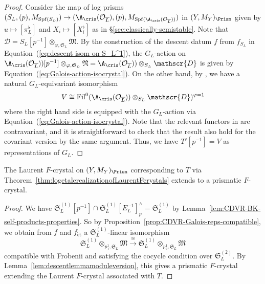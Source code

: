 \begin{proof}
Consider the map of log prisms $(S_L, (p), M_{\operatorname{Spf}(S_L)}) \rightarrow (\A_{\cris}(\mathcal{O}_{\overline{L}}), (p), M_{\operatorname{Spf}(\A_{\cris}(\mathcal{O}_{\overline{L}}))})$ in $(Y, M_Y)_{\Prism}$ given by $u \mapsto [\pi_L^{\flat}]$ and $X_i \mapsto [X_i^{\flat}]$ as in \S\ref{sec:classically-semistable}. Note that $\mathscr{D} = S_L[p^{-1}]\otimes_{\varphi, \mathfrak{S}_L} \mathfrak{M}$. By the construction of the descent datum $f$ from $f_{S_L}$ in Equation~(\ref{eq:descent isom on S_L^1}), the $G_L$-action on $\A_{\cris}(\mathcal{O}_{\overline{L}}))[p^{-1}]\otimes_{\varphi, \mathfrak{S}_L} \mathfrak{N} = \A_{\cris}(\mathcal{O}_{\overline{L}}))\otimes_{S_L} \mathscr{D}$ is given by Equation~(\ref{eq:Galois-action-isocrystal}). On the other hand, by \cite[\S4.1]{moon-strly-div-latt-cryst-cohom-CDVF}, we have a natural $G_L$-equivariant isomorphism
\[
V \cong \mathrm{Fil}^0(\A_{\cris}(\mathcal{O}_{\overline{L}}))\otimes_{S_L} \mathscr{D})^{\varphi = 1}
\]
where the right hand side is equipped with the $G_L$-action via Equation~(\ref{eq:Galois-action-isocrystal}). Note that the relevant functors in \cite{moon-strly-div-latt-cryst-cohom-CDVF} are contravariant, and it is straightforward to check that the result also hold for the covariant version by the same argument. Thus, we have $T'[p^{-1}] = V$ as representations of $G_L$.
\end{proof}

\begin{prop} \label{prop:classically-semistable-implies-semistable}
The Laurent $F$-crystal on $(Y, M_Y)_{\Prism}$ corresponding to $T$ via Theorem~\ref{thm:logetalerealizationofLaurentFcrystals} extends to a prismatic $F$-crystal.    
\end{prop}

\begin{proof}
We have $\mathfrak{S}_L^{(1)}[p^{-1}] \cap \mathfrak{S}_L^{(1)}[E_L^{-1}]^{\wedge}_p = \mathfrak{S}_L^{(1)}$ by Lemma~\ref{lem:CDVR-BK-self-products-properties}. So by Proposition~\ref{prop:CDVR-Galois-reps-compatible}, we obtain from $f$ and $f_{\mathrm{\acute{e}t}}$ a $\mathfrak{S}_L^{(1)}$-linear isomorphism
\[
\mathfrak{S}_L^{(1)}\otimes_{p^1_1, \mathfrak{S}_L} \mathfrak{M} \stackrel{\cong}{\rightarrow} \mathfrak{S}_L^{(1)}\otimes_{p^1_2, \mathfrak{S}_L} \mathfrak{M}
\]
compatible with Frobenii and satisfying the cocycle condition over $\mathfrak{S}_L^{(2)}$. By Lemma~\ref{lem:descentlemmamoduleversion}, this gives a prismatic $F$-crystal extending the Laurent $F$-crystal associated with $T$.  
\end{proof}






